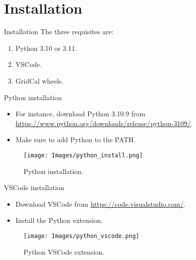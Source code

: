\section{Installation}

\begin{frame}{}
    \tableofcontents[currentsection]
\end{frame}


\begin{frame}{Installation}
    The three requisites are:
    \begin{enumerate}
        \item Python 3.10 or 3.11.
        \item VSCode.
        \item GridCal wheels.
    \end{enumerate}
\end{frame}

\begin{frame}{Python installation}
    \begin{itemize}
        \item For instance, download Python 3.10.9 from \href{https://www.python.org/downloads/release/python-3109/}{https://www.python.org/downloads/release/python-3109/}.
        \item Make sure to add Python to the PATH.
    \end{itemize}
    \begin{figure}[!htb]
        \centering
        \texttt{[image: Images/python\_install.png]}
        \caption{Python installation.}
        \label{fig:python_installation}
    \end{figure}
\end{frame}

\begin{frame}{VSCode installation}
    \begin{itemize}
        \item Download VSCode from \href{https://code.visualstudio.com/}{https://code.visualstudio.com/}.
        \item Install the Python extension.
    \end{itemize}
        \begin{figure}[!htb]
        \centering
        \texttt{[image: Images/python\_vscode.png]}
        \caption{Python VSCode extension.}
        \label{fig:vscode_installation}
    \end{figure}
\end{frame}

